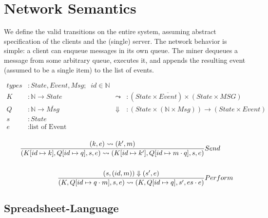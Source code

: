 \documentclass[acmsmall,review,anonymous]{acmart}\settopmatter{printfolios=true}
\begin{document}




\maketitle

\section{Network Semantics}

We define the valid transitions on the entire system, assuming abstract specification of the clients and the (single) server. The network behavior is simple: a client can enqueue messages in its own queue. The miner dequeues a message from some arbitrary queue, executes it, and appends the resulting event (assumed to be a single item) to the list of events.

\begin{align*}
types &: State, Event, Msg; \;\; id \in \mathbb{N} \\
K &: \mathbb{N} \rightarrow State \; & \leadsto &: (State \times \overline{Event}) \times (State \times MSG) \\
Q &: \mathbb{N} \rightarrow \overline{Msg} \; & \Downarrow &: (State \times (\mathbb{N} \times Msg)) \rightarrow (State \times Event) \\
s &: State \\
e &: \text{list of Event} \\
\end{align*}

\begin{align*}
\judge{&Send}{
	(k, e) \leadsto (k', m)
}{
	(K[id \mapsto k], Q[id \mapsto q], s, e) \leadsto (K[id \mapsto k'], Q[id \mapsto m \cdot q], s, e)
}
\\
\\
\judge{&Perform}{
    (s, (id, m)) \Downarrow (s', e)
}{
	(K, Q[id \mapsto q \cdot m], s, e) \leadsto (K, Q[id \mapsto q], s', es \cdot e)
}
\end{align*}

\pagebreak

\setlength{\grammarindent }{2cm}

\subsection{Spreadsheet-Language}
\end{document}
